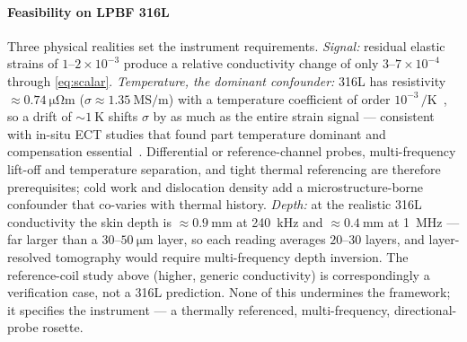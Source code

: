 \documentclass[preprint]{elsarticle}
\begin{document}
\paragraph{Feasibility on LPBF 316L} Three physical realities set the
instrument requirements. \emph{Signal:} residual elastic strains of
$1$--$2\times10^{-3}$ produce a relative conductivity change of only
$3$--$7\times10^{-4}$ through \cref{eq:scalar}.
\emph{Temperature, the dominant confounder:} 316L has resistivity
${\approx}\SI{0.74}{\micro\ohm\metre}$
($\sigma\approx\SI{1.35}{\mega\siemens\per\metre}$) with a temperature
coefficient of order $10^{-3}\,\si{\per\kelvin}$~\cite{nist316l}, so a drift
of ${\sim}\SI{1}{\kelvin}$ shifts $\sigma$ by as much as the entire strain
signal --- consistent with in-situ ECT studies that found part temperature
dominant and compensation essential~\cite{spurek2024}. Differential or
reference-channel probes, multi-frequency lift-off and temperature
separation, and tight thermal referencing are therefore prerequisites; cold
work and dislocation density add a microstructure-borne confounder that
co-varies with thermal history. \emph{Depth:} at the realistic 316L
conductivity the skin depth is ${\approx}\SI{0.9}{\milli\metre}$ at
\SI{240}{\kilo\hertz} and ${\approx}\SI{0.4}{\milli\metre}$ at
\SI{1}{\mega\hertz} --- far larger than a $30$--$\SI{50}{\micro\metre}$
layer, so each reading averages $20$--$30$ layers, and layer-resolved
tomography would require multi-frequency depth inversion. The reference-coil
study above (higher, generic conductivity) is correspondingly a verification
case, not a 316L prediction. None of this undermines the framework; it
specifies the instrument --- a thermally referenced, multi-frequency,
directional-probe rosette.
\end{document}

